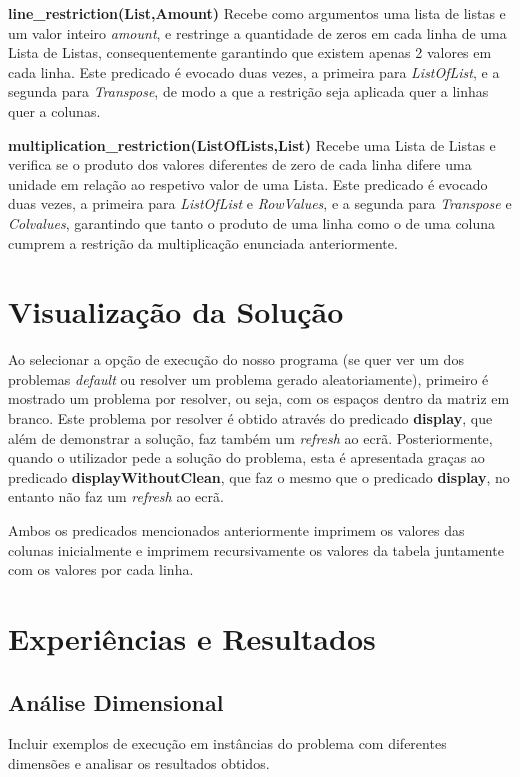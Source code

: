 \documentclass[11pt]{article}
\begin{document}
\bigskip

\textbf{line\_restriction(List,Amount)} Recebe como argumentos uma lista de listas e um valor 
inteiro \emph{amount}, e restringe a quantidade de zeros em cada linha de uma Lista de Listas,
 consequentemente garantindo que existem apenas 2 valores em cada linha. Este predicado é 
 evocado duas vezes, a primeira para \emph{ListOfList}, e a segunda para \emph{Transpose}, 
 de modo a que a restrição seja aplicada quer a linhas quer a colunas.

\bigskip

\textbf{multiplication\_restriction(ListOfLists,List)} Recebe uma Lista de Listas e verifica 
se o produto dos valores diferentes de zero de cada linha difere uma unidade em relação ao 
respetivo valor de uma Lista. Este predicado é evocado duas vezes, a primeira para 
\emph{ListOfList} e \emph{RowValues}, e a segunda para \emph{Transpose} e \emph{Colvalues}, 
garantindo que tanto o produto de uma linha como o de uma coluna cumprem a restrição da 
multiplicação enunciada anteriormente.


\section{Visualização da Solução}

Ao selecionar a opção de execução do nosso programa (se quer ver um dos problemas 
\textit{default} ou resolver um problema gerado aleatoriamente), primeiro é 
mostrado um problema por resolver, ou seja, com os espaços dentro da matriz em branco.
Este problema por resolver é obtido através do predicado \textbf{display}, que além
de demonstrar a solução, faz também um \textit{refresh} ao ecrã.
Posteriormente, quando o utilizador pede a solução do problema, esta é apresentada graças
ao predicado \textbf{displayWithoutClean}, que faz o mesmo que o predicado \textbf{display},
no entanto não faz um \textit{refresh} ao ecrã.

Ambos os predicados mencionados anteriormente imprimem os valores das colunas inicialmente
e imprimem recursivamente os valores da tabela juntamente com os valores por cada linha.

\section{Experiências e Resultados}

\subsection{Análise Dimensional} Incluir exemplos de execução em instâncias do problema com
diferentes dimensões e analisar os resultados obtidos.
\end{document}
